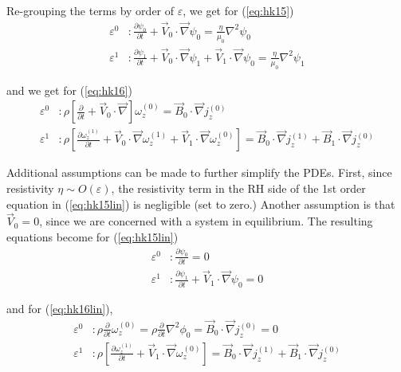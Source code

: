 \documentclass{article}
\begin{document}
Re-grouping the terms by order of $\varepsilon$, we get for (\ref{eq:hk15})
\begin{equation}
    \label{eq:hk15lin}
    \begin{split}
        \varepsilon^0 &: \frac{\partial \psi_0}{\partial t} + \vec{V}_0 \cdot \vec{\nabla} \psi_0 = \frac{\eta}{\mu_0}\nabla ^{2}\psi_0 \\
        \varepsilon^1 &: \frac{\partial \psi_1}{\partial t} + \vec{V}_0 \cdot \vec{\nabla} \psi_1 + \vec{V}_1 \cdot \vec{\nabla} \psi_0 = \frac{\eta}{\mu_0}\nabla ^{2}\psi_1
    \end{split}
\end{equation}

and we get for (\ref{eq:hk16})
\begin{equation}
    \label{eq:hk16lin}
    \begin{split}
        \varepsilon^0 &: \rho\left[ \frac{\partial}{\partial t} + \vec{V}_0 \cdot \vec{\nabla} \right] \omega_z^{(0)} = \vec{B}_0 \cdot \vec{\nabla}j_z^{(0)} \\
        \varepsilon^1 &: \rho\left[\frac{\partial \omega_z^{(1)}}{\partial t} + \vec{V}_0 \cdot \vec{\nabla}\omega_z^{(1)} + \vec{V}_1 \cdot \vec{\nabla}\omega_z^{(0)}\right] = \vec{B}_0 \cdot \vec{\nabla}j_z^{(1)} + \vec{B}_1 \cdot \vec{\nabla}j_z^{(0)}
    \end{split}
\end{equation} 

Additional assumptions can be made to further simplify the PDEs. First, since resistivity $\eta\sim O(\varepsilon)$, the resistivity term in the RH side of the 1st order equation in (\ref{eq:hk15lin}) is negligible (set to zero.)
Another assumption is that $\vec{V}_0=0$, since we are concerned with a system in equilibrium. The resulting equations become for (\ref{eq:hk15lin})
\begin{equation}
    \begin{split}
        \varepsilon^0 &: \frac{\partial \psi_0}{\partial t} = 0 \\
        \varepsilon^1 &: \frac{\partial \psi_1}{\partial t} + \vec{V}_1 \cdot \vec{\nabla} \psi_0 = 0
    \end{split}
\end{equation} 

and for (\ref{eq:hk16lin}),
\begin{equation}
    \begin{split}
        \varepsilon^0 &: \rho\frac{\partial}{\partial t}\omega_z^{(0)} = \rho\frac{\partial}{\partial t}\nabla ^{2} \phi_0 = \vec{B}_0 \cdot \vec{\nabla}j_z^{(0)} = 0 \\ 
                \varepsilon^1 &: \rho\left[\frac{\partial \omega_z^{(1)}}{\partial t} + \vec{V}_1 \cdot \vec{\nabla}\omega_z^{(0)}\right] = \vec{B}_0 \cdot \vec{\nabla}j_z^{(1)} + \vec{B}_1 \cdot \vec{\nabla}j_z^{(0)}
    \end{split}
\end{equation} 
\end{document}
